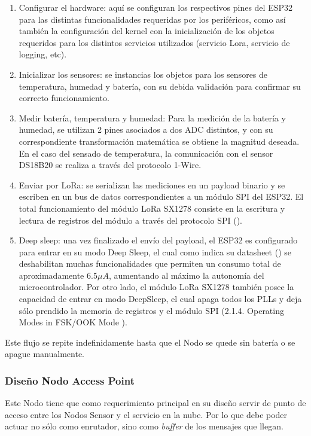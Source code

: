 \begin{enumerate}
    \item Configurar el hardware: aquí se configuran los respectivos pines del ESP32 para las distintas funcionalidades requeridas por los periféricos, como así también la configuración del kernel con la inicialización de los objetos requeridos para los distintos servicios utilizados (servicio Lora, servicio de logging, etc).
    \item Inicializar los sensores: se instancias los objetos para los sensores de temperatura, humedad y batería, con su debida validación para confirmar su correcto funcionamiento.
    \item Medir batería, temperatura y humedad: Para la medición de la batería y humedad, se utilizan 2 pines asociados a dos ADC distintos, y con su correspondiente transformación matemática se obtiene la magnitud deseada. En el caso del sensado de temperatura, la comunicación con el sensor DS18B20 se realiza a través del protocolo 1-Wire.
    \item Enviar por LoRa: se serializan las mediciones en un payload binario y se escriben en un bus de datos correspondientes a un módulo SPI del ESP32. El total funcionamiento del módulo LoRa SX1278 consiste en la escritura y lectura de registros del módulo a través del protocolo SPI (\cite{LoraDatasheet}).
    \item Deep sleep: una vez finalizado el envío del payload, el ESP32 es configurado para entrar en su modo Deep Sleep, el cual como indica su datasheet (\cite{Esp32Datasheet}) se deshabilitan muchas funcionalidades  que permiten un consumo total de aproximadamente $6.5 \mu A$, aumentando al máximo la autonomía del microcontrolador.
    Por otro lado, el módulo LoRa SX1278 también posee la capacidad de entrar en modo DeepSleep, el cual apaga todos los PLLs y deja sólo prendido la memoria de registros y el módulo SPI (2.1.4. Operating Modes in FSK/OOK Mode \cite{LoraDatasheet}).
\end{enumerate}

Este flujo se repite indefinidamente hasta que el Nodo se quede sin batería o se apague manualmente.

\subsubsection{Diseño Nodo Access Point}

Este Nodo tiene que como requerimiento principal en su diseño servir de punto de acceso entre los Nodos Sensor y el servicio en la nube. Por lo que debe poder actuar no sólo como enrutador, sino como \textit{buffer} de los mensajes que llegan.

